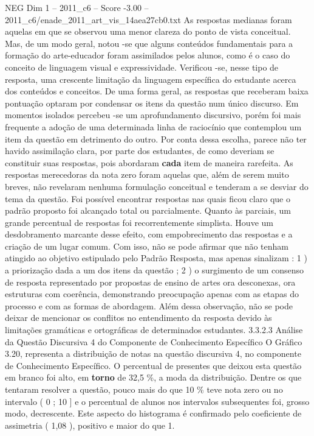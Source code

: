 \begin{textsample}{NEG Dim 1 – 2011\_c6 – Score -3.00 – 2011\_c6/enade\_2011\_art\_vis\_14aea27cb0.txt}
As respostas medianas foram aquelas em que se observou uma menor clareza do ponto de vista conceitual.
Mas, de um modo geral, notou -se que alguns conteúdos fundamentais para a formação do arte-educador foram assimilados pelos alunos, como é o caso do conceito de linguagem visual e expressividade.
Verificou -se, nesse tipo de resposta, uma crescente limitação da linguagem específica do estudante acerca dos conteúdos e conceitos.
De uma forma geral, as respostas que receberam baixa pontuação optaram por condensar os itens da questão num único discurso.
Em momentos isolados percebeu -se um aprofundamento discursivo, porém foi mais frequente a adoção de uma determinada linha de raciocínio que contemplou um item da questão em detrimento do outro.
Por conta dessa escolha, parece não ter havido assimilação clara, por parte dos estudantes, de como deveriam se constituir suas respostas, pois abordaram \textbf{cada} item de maneira rarefeita.
As respostas merecedoras da nota zero foram aquelas que, além de serem muito breves, não revelaram nenhuma formulação conceitual e tenderam a se desviar do tema da questão.
Foi possível encontrar respostas nas quais ficou claro que o padrão proposto foi alcançado total ou parcialmente.
Quanto às parciais, um grande percentual de respostas foi recorrentemente simplista.
Houve um desdobramento marcante desse efeito, com empobrecimento das respostas e a criação de um lugar comum.
Com isso, não se pode afirmar que não tenham atingido ao objetivo estipulado pelo Padrão Resposta, mas apenas sinalizam : 1 ) a priorização dada a um dos itens da questão ; 2 ) o surgimento de um consenso de resposta representado por propostas de ensino de artes ora desconexas, ora estruturas com coerência, demonstrando preocupação apenas com as etapas do processo e com as formas de abordagem.
Além dessa observação, não se pode deixar de mencionar os conflitos no entendimento da resposta devido às limitações gramáticas e ortográficas de determinados estudantes. 3.3.2.3 Análise da Questão Discursiva 4 do Componente de Conhecimento Específico O Gráfico 3.20, representa a distribuição de notas na questão discursiva 4, no componente de Conhecimento Específico.
O percentual de presentes que deixou esta questão em branco foi alto, em \textbf{torno} de 32,5 \%, a moda da distribuição.
Dentre os que tentaram resolver a questão, pouco mais do que 10 \% teve nota zero ou no intervalo ( 0 ; 10 ] e o percentual de alunos nos intervalos subsequentes foi, grosso modo, decrescente.
Este aspecto do histograma é confirmado pelo coeficiente de assimetria ( 1,08 ), positivo e maior do que 1.

\end{textsample}
